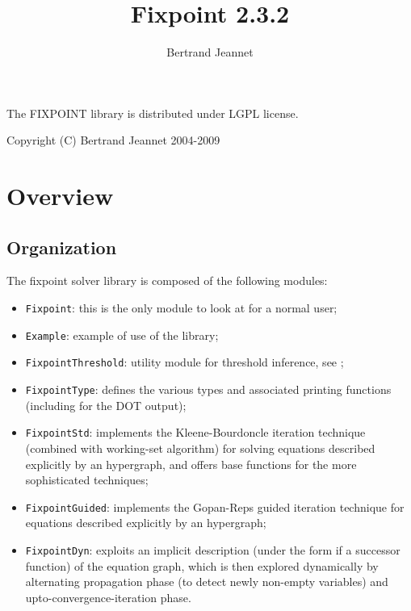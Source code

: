 \documentclass[twoside,10pt,a4paper]{report}
\title{Fixpoint 2.3.2}
\author{Bertrand Jeannet}
\begin{document}
\maketitle

\vspace*{0.9\textheight}

The FIXPOINT library is distributed under LGPL license.

Copyright (C) Bertrand Jeannet 2004-2009

\newpage

\tableofcontents

\chapter{Overview}

\section{Organization}

The fixpoint solver library is composed of the following modules:
\begin{itemize}\setlength{\itemsep}{0pt}
\item \texttt{Fixpoint}: this is the only module to look at for a
  normal user;
\item \texttt{Example}: example of use of the library;
\medskip

\item \texttt{FixpointThreshold}: utility module for threshold
  inference, see \cite{};

\item \texttt{FixpointType}: defines the various types and
  associated printing functions (including for the DOT output);
\item \texttt{FixpointStd}: implements the Kleene-Bourdoncle
  iteration technique \cite{bourdoncle93} (combined with
  working-set algorithm) for solving equations described
  explicitly by an hypergraph, and offers base functions for the
  more sophisticated techniques;
\item \texttt{FixpointGuided}: implements the Gopan-Reps guided
  iteration technique \cite{GopanReps07} for equations described
  explicitly by an hypergraph;
\item \texttt{FixpointDyn}: exploits an implicit description
  (under the form if a successor function) of the equation graph,
  which is then explored dynamically by alternating propagation
  phase (to detect newly non-empty variables) and
  upto-convergence-iteration phase.
\end{itemize}
\end{document}
